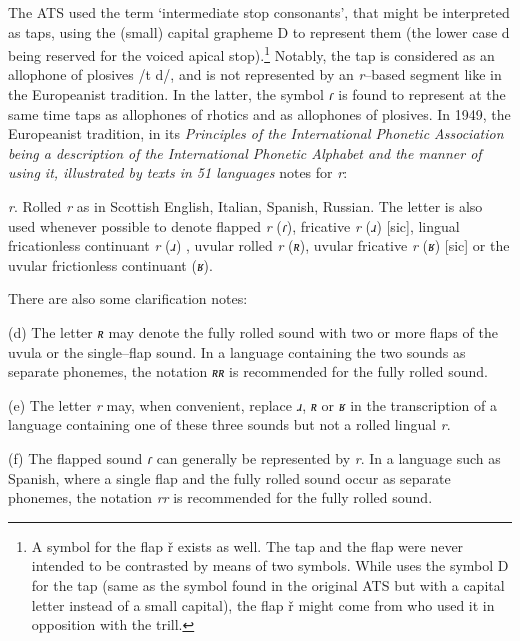 The ATS used the term ‘intermediate stop consonants’, that might be interpreted as taps, using the (small) capital grapheme D to represent them (the lower case d being reserved for the voiced apical stop).\footnote{A symbol for the flap ř exists as well. The tap and the flap were never intended to be contrasted by means of two symbols. While \textcite[88]{chomskyCurrentIssuesLinguistic1964} uses the symbol D for the tap (same as the symbol found in the original ATS but with a capital letter instead of a small capital), the flap ř might come from \textcite{smalleyManualArticulatoryPhonetics1963} who used it in opposition with the trill.}
Notably, the tap is considered as an allophone of plosives /t d/, and is not represented by an \textit{r}–based segment like in the Europeanist tradition. In the latter,  the symbol \textit{ɾ} is found to represent at the same time taps as allophones of rhotics and as allophones of plosives. In 1949, the Europeanist tradition, in its \textit{Principles of the International Phonetic Association being a description of the International Phonetic Alphabet and the manner of using it, illustrated by texts in 51 languages} \parencite{ipaPrinciplesInternationalPhonetic1949} notes for \textit{r}:

\begin{displayquote}
\textit{r}. Rolled \textit{r} as in Scottish English, Italian, Spanish, Russian. The letter is also used whenever possible to denote flapped \textit{r} (\textit{ɾ}), fricative \textit{r} (\textit{ɹ}) [sic], lingual fricationless continuant \textit{r} (\textit{ɹ}) , uvular rolled \textit{r} (\textit{ʀ}), uvular fricative \textit{r} (\textit{ʁ}) [sic] or the uvular frictionless continuant (\textit{ʁ}). \parencite[Section 26]{ipaPrinciplesInternationalPhonetic1949}
\end{displayquote}

There are also some clarification notes:

\begin{displayquote}
(d) The letter \textit{ʀ} may denote the fully rolled sound with two or more flaps of the uvula or the single–flap sound. In a language containing the two sounds as separate phonemes, the notation \textit{ʀʀ} is recommended for the fully rolled sound.

(e) The letter \textit{r} may, when convenient, replace \textit{ɹ}, \textit{ʀ} or \textit{ʁ} in the transcription of a language containing one of these three sounds but not a rolled lingual \textit{r}.

(f) The flapped sound \textit{ɾ} can generally be represented by \textit{r}. In a language such as Spanish, where a single flap and the fully rolled sound occur as separate phonemes, the notation \textit{rr} is recommended for the fully rolled sound. \parencite[Section 27]{ipaPrinciplesInternationalPhonetic1949}
\end{displayquote}

